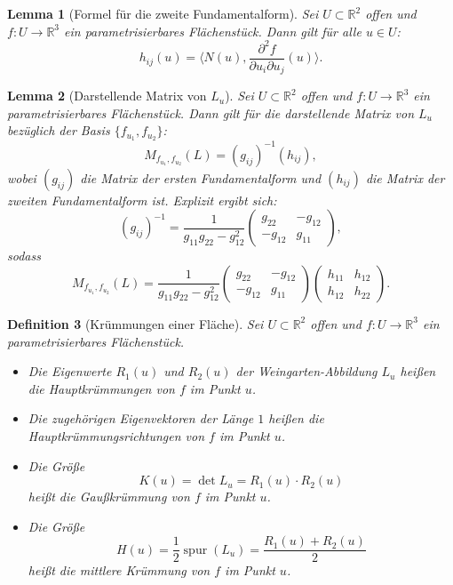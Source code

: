 \documentclass[a4paper,12pt]{article}
\theoremstyle{break}
\newtheorem{definition}{Definition}[section]
\newtheorem{lemma}[definition]{Lemma}
\begin{document}
\begin{lemma}[Formel für die zweite Fundamentalform]
Sei $U \subset \mathbb{R}^2$ offen und $f: U \to \mathbb{R}^3$ ein parametrisierbares Flächenstück. Dann gilt für alle $u \in U$:
\[
h_{ij}(u) = \langle N(u), \frac{\partial^2 f}{\partial u_i \partial u_j} (u) \rangle.
\]
\end{lemma}

\begin{lemma}[Darstellende Matrix von $L_u$]
Sei $U \subset \mathbb{R}^2$ offen und $f: U \to \mathbb{R}^3$ ein parametrisierbares Flächenstück. Dann gilt für die darstellende Matrix von $L_u$ bezüglich der Basis $\{f_{u_1}, f_{u_2}\}$:
\[
M_{f_{u_1}, f_{u_2}}(L) = (g_{ij})^{-1} (h_{ij}),
\]
wobei $(g_{ij})$ die Matrix der ersten Fundamentalform und $(h_{ij})$ die Matrix der zweiten Fundamentalform ist. Explizit ergibt sich:
\[
(g_{ij})^{-1} =
\frac{1}{g_{11} g_{22} - g_{12}^2}
\begin{pmatrix}
g_{22} & -g_{12} \\
-g_{12} & g_{11}
\end{pmatrix},
\]
sodass
\[
M_{f_{u_1}, f_{u_2}}(L) =
\frac{1}{g_{11} g_{22} - g_{12}^2}
\begin{pmatrix}
g_{22} & -g_{12} \\
-g_{12} & g_{11}
\end{pmatrix}
\begin{pmatrix}
h_{11} & h_{12} \\
h_{12} & h_{22}
\end{pmatrix}.
\]
\end{lemma}

\begin{definition}[Krümmungen einer Fläche]
Sei $U \subset \mathbb{R}^2$ offen und $f: U \to \mathbb{R}^3$ ein parametrisierbares Flächenstück.  

\begin{itemize}
    \item Die Eigenwerte $R_1(u)$ und $R_2(u)$ der Weingarten-Abbildung $L_u$ heißen die \emph{Hauptkrümmungen} von $f$ im Punkt $u$.
    \item Die zugehörigen Eigenvektoren der Länge $1$ heißen die \emph{Hauptkrümmungsrichtungen} von $f$ im Punkt $u$.
    \item Die Größe 
    \[
    K(u) = \det L_u = R_1(u) \cdot R_2(u)
    \]
    heißt die \emph{Gaußkrümmung} von $f$ im Punkt $u$.
    \item Die Größe 
    \[
    H(u) = \frac{1}{2} \operatorname{spur}(L_u) = \frac{R_1(u) + R_2(u)}{2}
    \]
    heißt die \emph{mittlere Krümmung} von $f$ im Punkt $u$.
\end{itemize}
\end{definition}
\end{document}
